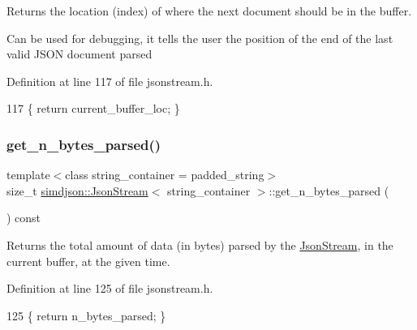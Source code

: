 Returns the location (index) of where the next document should be in the buffer. 

Can be used for debugging, it tells the user the position of the end of the last valid J\+S\+ON document parsed 

Definition at line 117 of file jsonstream.\+h.


\begin{DoxyCode}
117 \{ \textcolor{keywordflow}{return} current\_buffer\_loc; \}
\end{DoxyCode}
\mbox{\label{classsimdjson_1_1_json_stream_ac63006b60b0446cd20dfc102131e8a98}} 
\subsubsection{\texorpdfstring{get\+\_\+n\+\_\+bytes\+\_\+parsed()}{get\_n\_bytes\_parsed()}}
{\footnotesize\ttfamily template$<$class string\+\_\+container  = padded\+\_\+string$>$ \\
size\+\_\+t \hyperlink{classsimdjson_1_1_json_stream}{simdjson\+::\+Json\+Stream}$<$ string\+\_\+container $>$\+::get\+\_\+n\+\_\+bytes\+\_\+parsed (\begin{DoxyParamCaption}{ }\end{DoxyParamCaption}) const\hspace{0.3cm}{\ttfamily [inline]}}



Returns the total amount of data (in bytes) parsed by the \hyperlink{classsimdjson_1_1_json_stream}{Json\+Stream}, in the current buffer, at the given time. 



Definition at line 125 of file jsonstream.\+h.


\begin{DoxyCode}
125 \{ \textcolor{keywordflow}{return} n\_bytes\_parsed; \}
\end{DoxyCode}
\mbox{\label{classsimdjson_1_1_json_stream_a160e592d44374cc21c12a58a1648196b}} 
